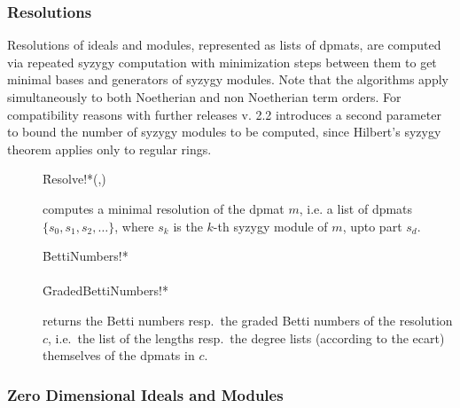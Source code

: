 \subsubsection{Resolutions}

Resolutions of ideals and modules, represented as lists of dpmats, are
computed via repeated syzygy computation with minimization steps
between them to get minimal bases and generators of syzygy
modules. Note that the algorithms apply simultaneously to both
Noetherian and non Noetherian term orders. For compatibility reasons
with further releases v. 2.2 introduces a second parameter to
bound the number of syzygy modules to be computed, since Hilbert's
syzygy theorem applies only to regular rings.
\begin{description}

\item[]
  \begin{syntax}
    \f{Resolve!*}(,)
  \end{syntax}
  \hypertarget{procedure:RESOLVE!*}{}
computes a minimal resolution of the dpmat $m$, i.e. a list of
dpmats $\{s_0, s_1, s_2,\ldots\}$, where $s_k$ is the $k$-th syzygy
module of $m$, upto part $s_d$.

\item[]
  \begin{syntaxtable}
    \f{BettiNumbers!*} \\
    \\
    \f{GradedBettiNumbers!*} 
  \end{syntaxtable}
  \hypertarget{procedure:BETTINUMBERS!*}{}
  \hypertarget{procedure:GRADEDBETTINUMBERS!*}{}
returns the Betti numbers resp.\ the graded Betti numbers of the
resolution $c$, i.e.\ the list of the lengths resp.\ the degree lists
(according to the ecart) themselves of the dpmats in $c$.
\end{description}

\subsubsection{Zero Dimensional Ideals and Modules}

